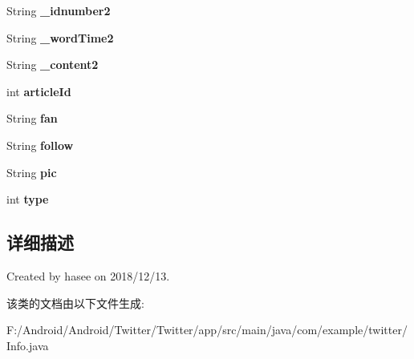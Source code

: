 \begin{DoxyCompactItemize}
String {\bfseries \+\_\+idnumber2}
\item 
\mbox{\label{classcom_1_1example_1_1twitter_1_1_info_a0431d3cf4a47f5277de1872ff288739d}} 
String {\bfseries \+\_\+word\+Time2}
\item 
\mbox{\label{classcom_1_1example_1_1twitter_1_1_info_ab49b56dfdf93806b2c819fafbb445fb2}} 
String {\bfseries \+\_\+content2}
\item 
\mbox{\label{classcom_1_1example_1_1twitter_1_1_info_a7010f62fe1f84a81b81a4c013de11554}} 
int {\bfseries article\+Id}
\item 
\mbox{\label{classcom_1_1example_1_1twitter_1_1_info_acfb9addd968d571b92f4a080258b9b5a}} 
String {\bfseries fan}
\item 
\mbox{\label{classcom_1_1example_1_1twitter_1_1_info_a54d64681c27583f0da9e5058a7e91bad}} 
String {\bfseries follow}
\item 
\mbox{\label{classcom_1_1example_1_1twitter_1_1_info_af38c49baadc83342f0176e559f8974b4}} 
String {\bfseries pic}
\item 
\mbox{\label{classcom_1_1example_1_1twitter_1_1_info_abf3cb26b53c3c124d703a2281441db9f}} 
int {\bfseries type}
\end{DoxyCompactItemize}


\subsection{详细描述}
Created by hasee on 2018/12/13. 

该类的文档由以下文件生成\+:\begin{DoxyCompactItemize}
\item 
F\+:/\+Android/\+Android/\+Twitter/\+Twitter/app/src/main/java/com/example/twitter/Info.\+java\end{DoxyCompactItemize}
